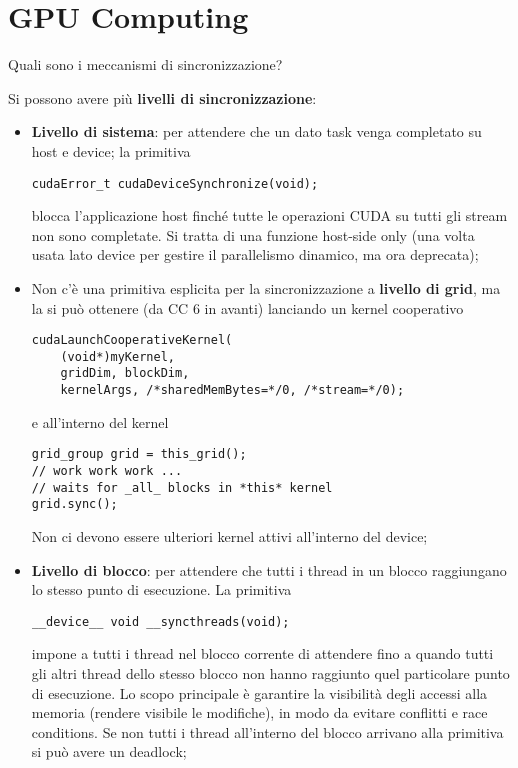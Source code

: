 \documentclass[12pt, answers]{exam}
\begin{document}
\section*{GPU Computing}

\begin{questions}
    
    \question Quali sono i meccanismi di sincronizzazione?
    
    \begin{solution}
        Si possono avere più \textbf{livelli di sincronizzazione}:
        \begin{itemize}
            \item \textbf{Livello di sistema}: per attendere che un dato task venga completato su host e device; la primitiva
            \begin{verbatim}
cudaError_t cudaDeviceSynchronize(void);
            \end{verbatim}
            blocca l'applicazione host finché tutte le operazioni CUDA su tutti gli stream non sono completate. Si tratta di una funzione host-side only (una volta usata lato device per gestire il parallelismo dinamico, ma ora deprecata);
            
            \item Non c'è una primitiva esplicita per la sincronizzazione a \textbf{livello di grid}, ma la si può ottenere (da CC 6 in avanti) lanciando un kernel cooperativo
            \begin{verbatim}
cudaLaunchCooperativeKernel(
    (void*)myKernel,
    gridDim, blockDim,
    kernelArgs, /*sharedMemBytes=*/0, /*stream=*/0);
            \end{verbatim}
            e all'interno del kernel
            \begin{verbatim}
grid_group grid = this_grid();
// work work work ...
// waits for _all_ blocks in *this* kernel
grid.sync();
            \end{verbatim}
            Non ci devono essere ulteriori kernel attivi all'interno del device;
            
            \item \textbf{Livello di blocco}: per attendere che tutti i thread in un blocco raggiungano lo stesso punto di esecuzione. La primitiva
            \begin{verbatim}
__device__ void __syncthreads(void);
            \end{verbatim}
            impone a tutti i thread nel blocco corrente di attendere fino a quando tutti gli altri thread dello stesso blocco non hanno raggiunto quel particolare punto di esecuzione. Lo scopo principale è garantire la visibilità degli accessi alla memoria (rendere visibile le modifiche), in modo da evitare conflitti e race conditions. Se non tutti i thread all'interno del blocco arrivano alla primitiva si può avere un deadlock;
            

\end{itemize}
\end{solution}
\end{questions}
\end{document}
